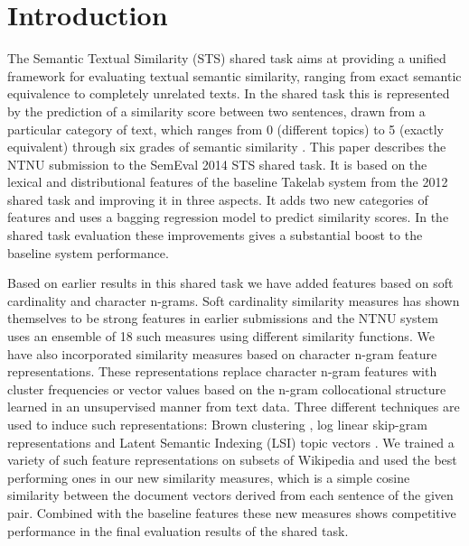 \section{Introduction}
\label{intro}


The Semantic Textual Similarity (STS) shared task aims at providing a unified framework for evaluating textual semantic similarity, ranging from exact semantic equivalence to completely unrelated texts. In the shared task this is represented by the prediction of a similarity score between two sentences, drawn from a particular category of text, which ranges from 0 (different topics) to 5 (exactly equivalent) through six grades of semantic similarity \cite{agirre-EtAl:2013:*SEM1}.
This paper describes the NTNU submission to the SemEval 2014 STS shared task. It is based on the lexical and distributional features of the baseline Takelab system from the 2012 shared task and improving it in three aspects. It adds two new categories of features and uses a bagging regression model to predict similarity scores. In the shared task evaluation these improvements gives a substantial boost to the baseline system performance.

Based on earlier results in this shared task we have added features based on soft cardinality and character n-grams. Soft cardinality similarity measures has shown themselves to be strong features in earlier submissions \cite{jimenez_softcardinality-core:_2013} and the NTNU system uses an ensemble of 18 such measures using different similarity functions.
We have also incorporated similarity measures based on character n-gram feature representations. These representations replace character n-gram features with cluster frequencies or vector values based on the n-gram collocational structure learned in an unsupervised manner from text data. Three different techniques are used to induce such representations: Brown clustering \cite{brown1992class}, log linear skip-gram representations \cite{mikolov2013efficient} and Latent Semantic Indexing (LSI) topic vectors \cite{deerwester1990indexing}. We trained a variety of such feature representations on subsets of Wikipedia and used the best performing ones in our new similarity measures, which is a simple cosine similarity between the document vectors derived from each sentence of the given pair.
Combined with the baseline features these new measures shows competitive performance in the final evaluation results of the shared task.

